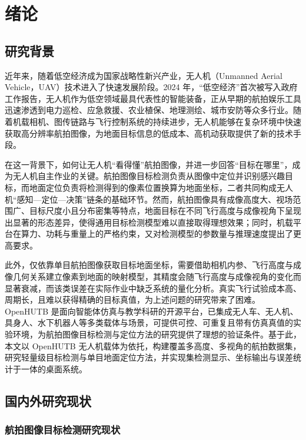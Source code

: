 \chapter{绪论}

\section{研究背景}

近年来，随着低空经济成为国家战略性新兴产业，无人机（Unmanned Aerial Vehicle，UAV）技术进入了快速发展阶段。2024 年，“低空经济”首次被写入政府工作报告，无人机作为低空领域最具代表性的智能装备，正从早期的航拍娱乐工具迅速渗透到电力巡检、应急救援、农业植保、地理测绘、城市安防等众多行业。随着机载相机、图传链路与飞行控制系统的持续进步，无人机能够在复杂环境中快速获取高分辨率航拍图像，为地面目标信息的低成本、高机动获取提供了新的技术手段。

在这一背景下，如何让无人机“看得懂”航拍图像，并进一步回答“目标在哪里”，成为无人机自主作业的关键。航拍图像目标检测负责从图像中定位并识别感兴趣目标，而地面定位负责将检测得到的像素位置换算为地面坐标，二者共同构成无人机“感知—定位—决策”链条的基础环节。然而，航拍图像具有成像高度大、视场范围广、目标尺度小且分布密集等特点，地面目标在不同飞行高度与成像视角下呈现出显著的形态差异，使得通用目标检测模型难以直接取得理想效果；同时，机载平台在算力、功耗与重量上的严格约束，又对检测模型的参数量与推理速度提出了更高要求。

此外，仅依靠单目航拍图像获取目标地面坐标，需要借助相机内参、飞行高度与成像几何关系建立像素到地面的映射模型，其精度会随飞行高度与成像视角的变化而显著衰减，而该类误差在实际作业中缺乏系统的量化分析。真实飞行试验成本高、周期长，且难以获得精确的目标真值，为上述问题的研究带来了困难。OpenHUTB 是面向智能体仿真与教学科研的开源平台，已集成无人车、无人机、具身人、水下机器人等多类载体与场景，可提供可控、可重复且带有仿真真值的实验环境，为航拍图像目标检测与定位方法的研究提供了理想的验证条件。基于此，本文以 OpenHUTB 无人机载体为依托，构建覆盖多高度、多视角的航拍数据集，研究轻量级目标检测与单目地面定位方法，并实现集检测显示、坐标输出与误差统计于一体的桌面系统。

\section{国内外研究现状}

\subsection{航拍图像目标检测研究现状}

